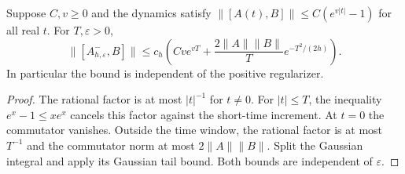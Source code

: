\begin{lemma}
    \label{lem:hk_regularized_frequency_uniform_locality}
    \leanok
    Suppose $C,v\ge0$ and the dynamics satisfy
    $\|[A(t),B]\|\le C(e^{v|t|}-1)$ for all real $t$.
    For $T,\varepsilon>0$,
    \[
        \|[A^-_{h,\varepsilon},B]\|
        \le c_h\left(Cve^{vT}
        +\frac{2\|A\|\|B\|}{T}e^{-T^2/(2h)}\right).
    \]
    In particular the bound is independent of the positive regularizer.
\end{lemma}
\begin{proof}\leanok
    The rational factor is at most $|t|^{-1}$ for $t\ne0$.
    For $|t|\le T$, the inequality $e^x-1\le xe^x$ cancels this
    factor against the short-time increment. At $t=0$ the
    commutator vanishes. Outside the time window, the rational factor
    is at most $T^{-1}$ and the commutator norm at most
    $2\|A\|\|B\|$. Split the Gaussian integral and apply its
    Gaussian tail bound. Both bounds are independent of $\varepsilon$.
\end{proof}

